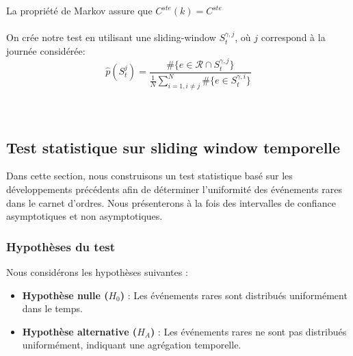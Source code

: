 \documentclass[12pt,a4paper]{article}
\theoremstyle{definition}
\theoremstyle{remark}
\begin{document}
La propriété de Markov assure que $C^{ste}(k) = C^{ste}$
\\
\\
On crée notre test en utilisant une sliding-window $S_t^{\gamma,j}$, où $j$ correspond à la journée considérée:
$$\hat p(S_t^j) = \frac{\#\{e\in \mathcal{R}\cap S_t^{\gamma,j}\}}{\frac{1}{N}\sum_{i=1,i\neq j}^N\#\{e\in S_t^{\gamma,i}\}}$$
\\
\\













































\subsection{Test statistique sur sliding window temporelle}

Dans cette section, nous construisons un test statistique basé sur les développements précédents afin de déterminer l'uniformité des événements rares dans le carnet d'ordres. Nous présenterons à la fois des intervalles de confiance asymptotiques et non asymptotiques.

\subsubsection{Hypothèses du test}

Nous considérons les hypothèses suivantes :

\begin{itemize}
    \item \textbf{Hypothèse nulle ($H_0$)} : Les événements rares sont distribués uniformément dans le temps.
    \item \textbf{Hypothèse alternative ($H_A$)} : Les événements rares ne sont pas distribués uniformément, indiquant une agrégation temporelle.
\end{itemize}
\end{document}
